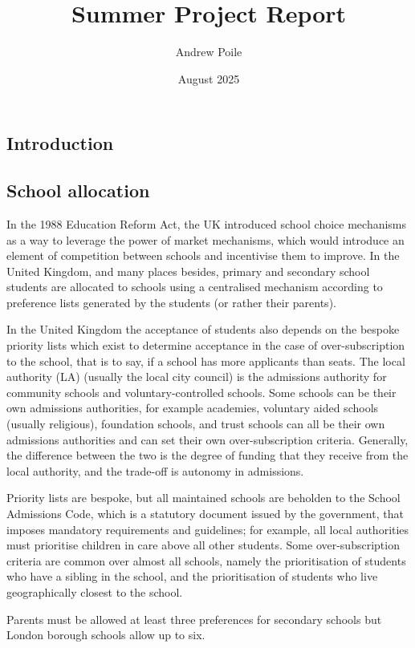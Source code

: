 \documentclass{article}
\title{Summer Project Report}
\author{Andrew Poile}
\date{August 2025}
\begin{document}
\maketitle

\begin{multicols}{2}
\section{Introduction}
\subsection{School allocation}
In the 1988 Education Reform Act, the UK introduced school choice mechanisms as a way to leverage the power of market mechanisms, which would introduce an element of competition between schools and incentivise them to improve. In the United Kingdom, and many places besides, primary and secondary school students are allocated to schools using a centralised mechanism according to preference lists generated by the students (or rather their parents).

In the United Kingdom the acceptance of students also depends on the bespoke priority lists which exist to determine acceptance in the case of over-subscription to the school, that is to say, if a school has more applicants than seats. The local authority (LA) (usually the local city council) is the admissions authority for community schools and voluntary-controlled schools. Some schools can be their own admissions authorities, for example academies, voluntary aided schools (usually religious), foundation schools, and trust schools can all be their own admissions authorities and can set their own over-subscription criteria. Generally, the difference between the two is the degree of funding that they receive from the local authority, and the trade-off is autonomy in admissions.

Priority lists are bespoke, but all maintained schools are beholden to the School Admissions Code, which is a statutory document issued by the government, that imposes mandatory requirements and guidelines; for example, all local authorities must prioritise children in care above all other students. Some over-subscription criteria are common over almost all schools, namely the prioritisation of students who have a sibling in the school, and the prioritisation of students who live geographically closest to the school.

Parents must be allowed at least three preferences for secondary schools but London borough schools allow up to six. 


\end{multicols}
\end{document}
